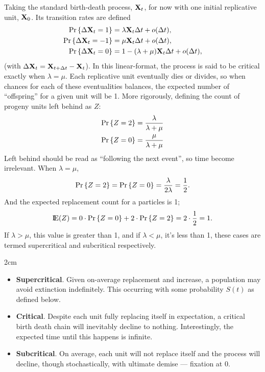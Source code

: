 Taking the standard birth-death process, ${{\bf X}_t}$, for now with one initial replicative unit, ${\bf X}_0$. Its transition rates are defined
\begin{align*}
{\text{Pr}\left\{\Delta {{\bf X}_t}= 1\right\}} &= \lambda {{\bf X}_t} \Delta t + o(\Delta t),\\
{\text{Pr}\left\{\Delta {{\bf X}_t} = -1\right\}} &= \mu {{\bf X}_t} \Delta t + o(\Delta t),\\
{\text{Pr}\left\{\Delta {{\bf X}_t} = 0\right\}} &= 1 - (\lambda + \mu) {{\bf X}_t} \Delta t + o(\Delta t),
\end{align*}
(with $\Delta {{\bf X}_t} = {{\bf X}_{t+\Delta t}} - {{\bf X}_t}$). In this linear-format, the process is said to be critical exactly when $\lambda = \mu$. Each replicative unit eventually dies or divides, so when chances for each of these eventualities balances, the expected number of ``offspring'' for a given unit will be 1. More rigorously, defining the count of progeny units left behind as $Z$:
\begin{align*}
{\text{Pr}\left\{Z=2\right\}} &= \frac{\lambda}{\lambda + \mu}\\
{\text{Pr}\left\{Z=0\right\}} &= \frac{\mu}{\lambda + \mu}
\end{align*}
Left behind should be read as ``following the next event'', so time become irrelevant. When $\lambda = \mu$, 
$${\text{Pr}\left\{Z=2\right\}} = {\text{Pr}\left\{Z=0\right\}} = \frac{\lambda}{2\lambda} = \frac{1}{2}.$$
And the expected replacement count for a particles is 1;
$${\rm I}\!{\rm E}(Z) = 0\cdot {\text{Pr}\left\{Z = 0\right\}} + 2 \cdot {\text{Pr}\left\{Z = 2\right\}} = 2\cdot \frac{1}{2} = 1.$$
If $\lambda > \mu$, this value is greater than 1, and if $\lambda < \mu$, it's less than 1, these cases are termed supercritical and subcritical respectively.
\vspace{15pt}
\begin{adjustwidth}{2cm}{}
\begin{itemize}
\item[$\mean{Z} > 1$:] \textbf{Supercritical}. Given on-average replacement and increase, a population may avoid extinction indefinitely. This occurring with some probability $S(t)$ as defined below. 
\item[$\mean{Z} = 1:$] \textbf{Critical}. Despite each unit fully replacing itself in expectation, a critical birth death chain will inevitably decline to nothing. Interestingly, the expected time until this happens is infinite. 
\item[$\mean{Z} < 1:$] \textbf{Subcritical}. On average, each unit will not replace itself and the process will decline, though stochastically, with ultimate demise --- fixation at 0.
\end{itemize}
\end{adjustwidth}



